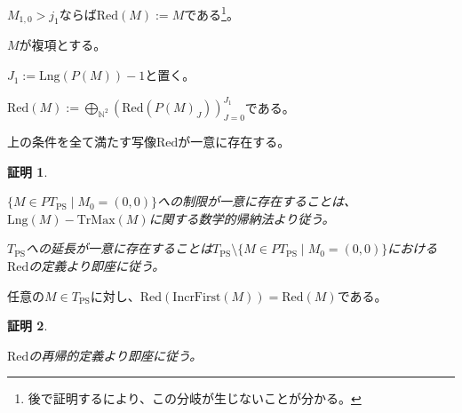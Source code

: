 \documentclass[dvipdfmx,uplatex]{jsarticle}
\theoremstyle{customnonumberbreakfortheorem}
\theoremstyle{customnonumberbreakforproof}
\newtheorem{hideableproof}{証明}
\begin{document}
\begin{nenumerate}
\begin{nenumerate}
\begin{nenumerate}
\begin{nenumerate}
\begin{nenumerate}
					\item \(M_{1,0} > j_1\)ならば\(\textrm{Red}(M) := M\)である\footnote{後で証明するにより、この分岐が生じないことが分かる。}。
				\end{nenumerate}
			\end{nenumerate}
		\end{nenumerate}
	\end{nenumerate}
	\item \(M\)が複項とする。
	\begin{nenumerate}
		\item \(J_1 := \textrm{Lng}(P(M)) - 1\)と置く。
		\item \(\textrm{Red}(M) := \bigoplus_{\mathbb{N}^2} (\textrm{Red}(P(M)_J))_{J=0}^{J_1}\)である。
	\end{nenumerate}
\end{nenumerate}

\begin{proposition}\label{Redのwell-defined性}
	上の条件を全て満たす写像\(\textrm{Red}\)が一意に存在する。
\end{proposition}

\begin{hideableproof}
	\begin{indented}
		\item \(\{M \in PT_{\textrm{PS}} \mid M_0 = (0,0)\}\)への制限が一意に存在することは、\(\textrm{Lng}(M) - \textrm{TrMax}(M)\)に関する数学的帰納法より従う。
		\item \(T_{\textrm{PS}}\)への延長が一意に存在することは\(T_{\textrm{PS}} \setminus \{M \in PT_{\textrm{PS}} \mid M_0 = (0,0)\}\)における\(\textrm{Red}\)の定義より即座に従う。
	\end{indented}
\end{hideableproof}

\begin{proposition}\label{RedのIncrFirst不変性}
	任意の\(M \in T_{\textrm{PS}}\)に対し、\(\textrm{Red}(\textrm{IncrFirst}(M)) = \textrm{Red}(M)\)である。
\end{proposition}

\begin{hideableproof}
	\begin{indented}
		\item \(\textrm{Red}\)の再帰的定義より即座に従う。
	\end{indented}
\end{hideableproof}
\end{document}
